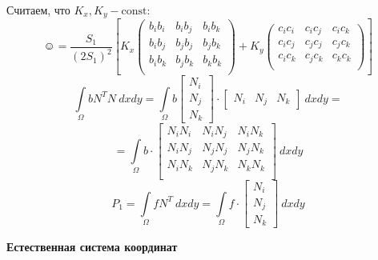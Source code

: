 	
	Считаем, что $K_x, K_y - \text{const}$:
	\[
	\smiley = \dfrac{S_1}{(2S_1)^2} \left[K_x \begin{pmatrix}
		b_ib_i & b_ib_j & b_ib_k \\
		b_ib_j & b_jb_j & b_jb_k \\
		b_ib_k & b_jb_k & b_kb_k \\
	\end{pmatrix}+ K_y \begin{pmatrix}
	c_ic_i & c_ic_j & c_ic_k \\
	c_ic_j & c_jc_j & c_jc_k \\
	c_ic_k & c_jc_k & c_kc_k \\
	\end{pmatrix} \right] 
	\]
	\[
	\int\limits_{\Omega} b N^T N\ dx dy = \int\limits_{\Omega} b \begin{bmatrix}
		N_i \\ N_j \\ N_k
		\end{bmatrix}
		\cdot
		\begin{bmatrix}
		N_i & N_j & N_k
		\end{bmatrix}
		\ dx dy = 
	\]
	\[
	= \int\limits_{\Omega} b \cdot
	\begin{bmatrix}
	N_iN_i & N_iN_j & N_iN_k \\
	N_iN_j & N_jN_j & N_jN_k \\
	N_iN_k & N_jN_k & N_kN_k \\
	\end{bmatrix}
	\ dx dy
	\]
	\[
	P_1 = \int\limits_{\Omega} f N^T \ dx dy = \int\limits_{\Omega} f \cdot 
	\begin{bmatrix}
		N_i \\ N_j \\ N_k
		\end{bmatrix}
	\ dx dy
	\]
	\newpage
	\begin{center}
		\textbf{Естественная система координат}
	\end{center}
